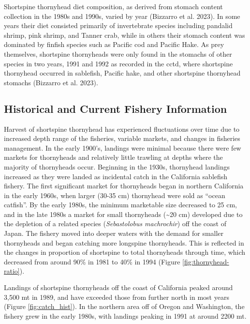 \documentclass[11pt,
  letterpaper,
]{article}
\begin{document}
Shortspine thornyhead diet composition, as derived from stomach content collection in the 1980s and 1990s, varied by year (Bizzarro et al. 2023). In some years their diet consisted primarily of invertebrate species including pandalid shrimp, pink shrimp, and Tanner crab, while in others their stomach content was dominated by finfish species such as Pacific cod and Pacific Hake. As prey themselves, shortspine thornyheads were only found in the stomachs of other species in two years, 1991 and 1992 as recorded in the \gls{cctd}, where shortspine thornyhead occurred in sablefish, Pacific hake, and other shortspine thornyhead stomachs (Bizzarro et al. 2023).

\hypertarget{historical-and-current-fishery-information}{%
\subsection{Historical and Current Fishery Information}\label{historical-and-current-fishery-information}}

Harvest of shortspine thornyhead has experienced fluctuations over time due to increased depth range of the fisheries, variable markets, and changes in fisheries management. In the early 1900's, landings were minimal because there were few markets for thornyheads and relatively little trawling at depths where the majority of thornyheads occur. Beginning in the 1930s, thornyhead landings increased as they were landed as incidental catch in the California sablefish fishery. The first significant market for thornyheads began in northern California in the early 1960s, when larger (30-35 cm) thornyhead were sold as ``ocean catfish''. By the early 1980s, the minimum marketable size decreased to 25 cm, and in the late 1980s a market for small thornyheads (\textasciitilde20 cm) developed due to the depletion of a related species (\emph{Sebastolobus machrochir}) off the coast of Japan. The fishery moved into deeper waters with the demand for smaller thornyheads and began catching more longspine thornyheads. This is reflected in the changes in proportion of shortspine to total thornyheads through time, which decreased from around 90\% in 1981 to 40\% in 1994 (Figure \ref{fig:thornyhead-ratio}).

Landings of shortspine thornyheads off the coast of California peaked around 3,500 mt in 1989, and have exceeded those from further north in most years (Figure \ref{fig:catch_hist}). In the northern area off of Oregon and Washington, the fishery grew in the early 1980s, with landings peaking in 1991 at around 2200 mt.
\end{document}
